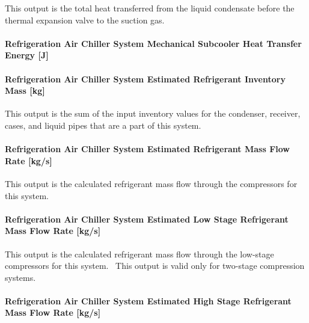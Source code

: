 This output is the total heat transferred from the liquid condensate before the thermal expansion valve to the suction gas.

\paragraph{Refrigeration Air Chiller System Mechanical Subcooler Heat Transfer Energy {[}J{]}}\label{refrigeration-air-chiller-system-mechanical-subcooler-heat-transfer-energy-j}

\paragraph{Refrigeration Air Chiller System Estimated Refrigerant Inventory Mass {[}kg{]}}\label{refrigeration-air-chiller-system-estimated-refrigerant-inventory-mass-kg}

This output is the sum of the input inventory values for the condenser, receiver, cases, and liquid pipes that are a part of this system.

\paragraph{Refrigeration Air Chiller System Estimated Refrigerant Mass Flow Rate {[}kg/s{]}}\label{refrigeration-air-chiller-system-estimated-refrigerant-mass-flow-rate-kgs}

This output is the calculated refrigerant mass flow through the compressors for this system.

\paragraph{Refrigeration Air Chiller System Estimated Low Stage Refrigerant Mass Flow Rate {[}kg/s{]}}\label{refrigeration-air-chiller-system-estimated-low-stage-refrigerant-mass-flow-rate-kgs}

This output is the calculated refrigerant mass flow through the low-stage compressors for this system.~ This output is valid only for two-stage compression systems.

\paragraph{Refrigeration Air Chiller System Estimated High Stage Refrigerant Mass Flow Rate {[}kg/s{]}}\label{refrigeration-air-chiller-system-estimated-high-stage-refrigerant-mass-flow-rate-kgs}

